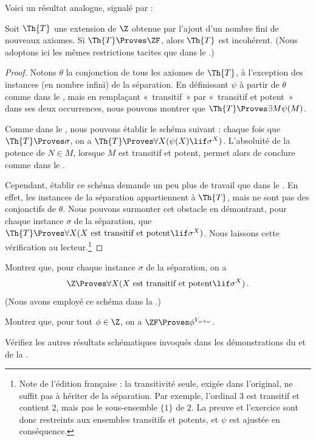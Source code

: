 \documentclass[../../../include/open-logic-section]{subfiles}
\begin{document}
Voici un résultat analogue, signalé par
\citet[223]{Potter2004} :

\begin{prop}
	Soit $\Th{T}$ une extension de $\Z$ obtenue par
	l'ajout d'un nombre fini de nouveaux axiomes.
	Si $\Th{T} \Proves \ZF$, alors $\Th{T}$ est
	incohérent. (Nous adoptons ici les mêmes restrictions
	tacites que dans le .)
\end{prop}
\begin{proof}
	Notons $\theta$ la conjonction de tous les axiomes
	de $\Th{T}$, à l'exception des instances (en
	nombre infini) de la séparation. En définissant
	$\psi$ à partir de $\theta$ comme dans le
	, mais en remplaçant «~transitif~» par «~transitif et potent~» dans ses deux occurrences, nous pouvons montrer que
	$\Th{T} \Proves \exists M \psi(M)$.

	Comme dans le , nous pouvons
	établir le schéma suivant : chaque fois que
	$\Th{T} \Proves \sigma$, on a
	$\Th{T} \Proves \forall X(\psi(X) \lif \sigma^X)$.
	L'absoluité de la potence de $N \in M$, lorsque $M$ est transitif et potent, permet alors de conclure
	comme dans le .

	Cependant, établir ce schéma demande un peu plus
	de travail que dans le . En effet,
	les instances de la séparation appartiennent à
	$\Th{T}$, mais ne sont pas des conjonctifs de
	$\theta$. Nous pouvons surmonter cet obstacle
	en démontrant, pour chaque instance $\sigma$
	de la séparation, que
	$\Th{T} \Proves \forall X(X\text{ est transitif et potent}
	\lif \sigma^X)$. Nous laissons cette vérification
	au lecteur.\footnote{Note de l'édition française : la transitivité seule, exigée dans l'original, ne suffit pas à hériter de la séparation. Par exemple, l'ordinal $3$ est transitif et contient $2$, mais pas le sous-ensemble $\{1\}$ de $2$. La preuve et l'exercice sont donc restreints aux ensembles transitifs et potents, et $\psi$ est ajustée en conséquence.}
\end{proof}
\begin{prob}
	Montrez que, pour chaque instance $\sigma$ de la
	séparation, on a
	\[
	  \Z \Proves \forall X(X\text{ est transitif et potent}
	  \lif \sigma^X)\,.
	\]
	(Nous avons employé ce schéma
	dans la
	.)
\end{prob}
\begin{prob}
	Montrez que, pour tout $\phi \in \Z$, on a
	$\ZF \Proves \phi^{V_{\omega+\omega}}$.
\end{prob}
\begin{prob}
	Vérifiez les autres résultats schématiques invoqués
	dans les démonstrations du
	et de la
	.
\end{prob}
\end{document}
